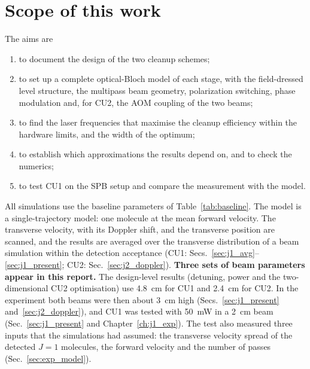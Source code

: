 \documentclass[11pt,a4paper,oneside]{report}
\begin{document}
\section{Scope of this work}

The aims are
\begin{enumerate}
  \item to document the design of the two cleanup schemes;
  \item to set up a complete optical-Bloch model of each stage, with the field-dressed level
        structure, the multipass beam geometry, polarization switching, phase modulation and,
        for CU2, the AOM coupling of the two beams;
  \item to find the laser frequencies that maximise the cleanup efficiency within the
        hardware limits, and the width of the optimum;
  \item to establish which approximations the results depend on, and to check the numerics;
  \item to test CU1 on the SPB setup and compare the measurement with the model.
\end{enumerate}

All simulations use the baseline parameters of Table~\ref{tab:baseline}. The model is a
single-trajectory model: one molecule at the mean forward velocity. The transverse velocity,
with its Doppler shift, and the transverse position are scanned, and the results are averaged
over the transverse distribution of a beam simulation within the detection acceptance
(CU1: Secs.~\ref{sec:j1_avg}--\ref{sec:j1_present}; CU2: Sec.~\ref{sec:j2_doppler}).
\textbf{Three sets of beam parameters appear in this report.} The design-level results (detuning,
power and the two-dimensional CU2 optimisation) use \SI{4.8}{cm} for CU1 and \SI{2.4}{cm} for CU2.
In the experiment both beams were then about \SI{3}{cm} high (Secs.~\ref{sec:j1_present}
and~\ref{sec:j2_doppler}), and CU1 was tested with \SI{50}{mW} in a \SI{2}{cm} beam
(Sec.~\ref{sec:j1_present} and Chapter~\ref{ch:j1_exp}). The test also measured three inputs that
the simulations had assumed: the transverse velocity spread of the detected $J=1$ molecules, the
forward velocity and the number of passes (Sec.~\ref{sec:exp_model}).
\end{document}
